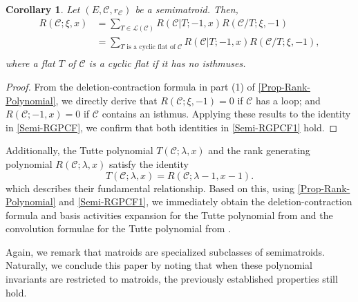 \documentclass[12pt]{article}%
\numberwithin{equation}{section}
\newtheorem{corollary}[corollary]{Corollary}
\begin{document}
\begin{corollary}\label{Semi-RGPCF1}
Let $(E,\mathcal{C},r_{\mathcal{C}})$ be a semimatroid. Then,
\begin{align*}
R(\mathcal{C};\xi,x)&=\sum_{T\in\mathscr{L}(\mathcal{C})}R(\mathcal{C}|T;-1,x)R(\mathcal{C}/T;\xi,-1)\\
&=\sum_{T\text{ is a cyclic flat of }\mathcal{C}}R(\mathcal{C}|T;-1,x)R(\mathcal{C}/T;\xi,-1),\\
\end{align*}
where a flat $T$ of $\mathcal{C}$ is a cyclic flat if it has no isthmuses.
\end{corollary}
\begin{proof}
From the deletion-contraction formula in part (1) of \autoref{Prop-Rank-Polynomial}, we directly derive that $R(\mathcal{C};\xi,-1)=0$ if  $\mathcal{C}$ has a loop; and $R(\mathcal{C};-1,x)=0$ if  $\mathcal{C}$ contains an isthmus. Applying  these results to the identity in \eqref{Semi-RGPCF}, we confirm that both identities in \autoref{Semi-RGPCF1} hold.
\end{proof}

Additionally, the Tutte polynomial $T(\mathcal{C};\lambda,x)$ and the rank generating polynomial $R(\mathcal{C};\lambda,x)$ satisfy the identity
\[
T(\mathcal{C};\lambda,x)=R(\mathcal{C};\lambda-1,x-1). 
\]
which describes their fundamental relationship. Based on this, using \autoref{Prop-Rank-Polynomial} and \autoref{Semi-RGPCF1}, we immediately obtain the deletion-contraction formula and basis activities expansion for the Tutte polynomial from \cite[Proposition 8.2, Theorem 9.5]{Ardila2007} and the convolution formulae for the Tutte polynomial from \cite[Theorem 3.5, Corollary 3.7]{Fu2025}.

Again, we remark that matroids are specialized subclasses of semimatroids. Naturally, we conclude this paper by noting that when these polynomial invariants are restricted to matroids, the previously established properties still hold.
\end{document}
